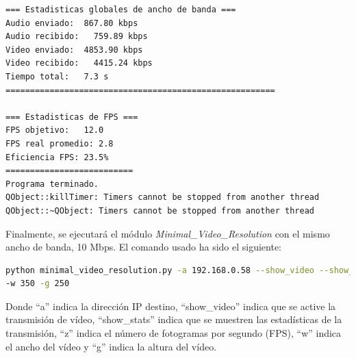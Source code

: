 \begin{lstlisting}[language=bash,basicstyle=\ttfamily\scriptsize]
=== Estadisticas globales de ancho de banda ===
Audio enviado:	867.80 kbps
Audio recibido:   759.89 kbps
Video enviado:	4853.90 kbps
Video recibido:   4415.24 kbps
Tiempo total: 	7.3 s
=======================================================

=== Estadisticas de FPS ===
FPS objetivo: 	12.0
FPS real promedio: 2.8
Eficiencia FPS:	23.5%
==========================
Programa terminado.
QObject::killTimer: Timers cannot be stopped from another thread
QObject::~QObject: Timers cannot be stopped from another thread
\end{lstlisting}
\vspace{\baselineskip}

\newpage

Finalmente, se ejecutará el módulo \textit{Minimal\_Video\_Resolution} con el mismo ancho de banda, 10 Mbps. El comando usado ha sido el siguiente:
\begin{lstlisting}[language=bash,basicstyle=\ttfamily\scriptsize]
python minimal_video_resolution.py -a 192.168.0.58 --show_video --show_stats -z 12 \\
-w 350 -g 250
\end{lstlisting}
Donde ``a'' indica la dirección IP destino, ``show\_video'' indica que se active la transmisión de vídeo, ``show\_stats'' indica que se muestren las estadísticas de la transmisión, ``z'' indica el número de fotogramas por segundo (FPS), ``w'' indica el ancho del vídeo y ``g'' indica la altura del vídeo.
\vspace{\baselineskip}

